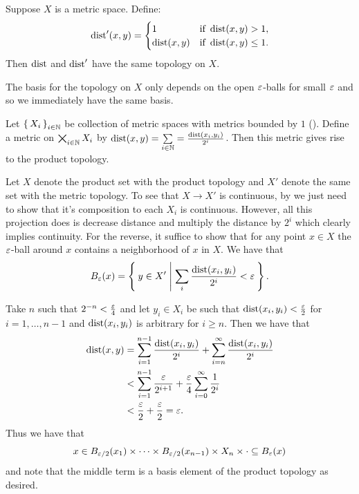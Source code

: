 \documentclass[letterpaper, 11pt, oneside]{book}
\begin{document}
\begin{prop}\label{prop: bounded_metric_leq_1}
  Suppose $X$ is a metric space. Define:
  \[
  \operatorname{dist}'(x, y) = \begin{cases}
                   1           & \text{if } \operatorname{dist}(x, y) > 1, \\
                   \operatorname{dist}(x, y) & \text{if } \operatorname{dist}(x, y) \leq 1.
                 \end{cases}
  \]
  Then $\operatorname{dist}$ and $\operatorname{dist}'$ have the same topology on $X$.
\end{prop}
\begin{pf}
  The basis for the topology on $X$ only depends on the open $\varepsilon$-balls for small $\varepsilon$ and so we immediately have the same basis.
\end{pf}

\begin{prop}\label{prop: bounded_metrics_prod_top}
  Let $\set{X_{i}}_{i \in \mathbb{N}}$ be collection of metric spaces with metrics bounded by $1$ ().
  Define a metric on $\bigtimes_{i \in \mathbb{N}} X_{i}$ by $\operatorname{dist}(x, y) = \sum\limits_{i \in \mathbb{N}} = \frac{\operatorname{dist}(x_{i}, y_{i})}{2^{i}}$.
  Then this metric gives rise to the product topology.
\end{prop}
\begin{pf}
  Let $X$ denote the product set with the product topology and $X'$ denote the same set with the metric topology.
  To see that $X \to X'$ is continuous, by  we just need to show that it's composition to each $X_{i}$ is continuous.
  However, all this projection does is decrease distance and multiply the distance by $2^{i}$ which clearly implies continuity.
  For the reverse, it suffice to show that for any point $x \in X$ the $\varepsilon$-ball around $x$ contains a neighborhood of $x$ in $X$.
  We have that
  \[
    B_{\varepsilon}(x) = \Set{y \in X' | \sum_{i} \frac{\operatorname{dist}(x_{i}, y_{i})}{2^{i}} < \varepsilon}.
  \]

  \clearpage

  Take $n$ such that $2^{-n} < \frac{\varepsilon}{4}$ and let $y_{i} \in X_{i}$ be such that $\operatorname{dist}(x_{i}, y_{i}) < \frac{\varepsilon}{2}$ for $i = 1, \ldots, n - 1$ and $\operatorname{dist}(x_{i}, y_{i})$ is arbitrary for $i \geq n$.
  Then we have that
  \begin{align*}
    \operatorname{dist}(x, y) &= \sum_{i = 1}^{n - 1} \frac{\operatorname{dist}(x_{i}, y_{i})}{2^{i}} + \sum_{i = n}^{\infty} \frac{\operatorname{dist}(x_{i}, y_{i})}{2^{i}} \\
                &< \sum_{i = 1}^{n - 1} \frac{\varepsilon}{2^{i + 1}} + \frac{\varepsilon}{4} \sum_{i = 0}^{\infty} \frac{1}{2^{i}} \\
                &< \frac{\varepsilon}{2} + \frac{\varepsilon}{2} = \varepsilon.
  \end{align*}
  Thus we have that
  \[
    x \in B_{\varepsilon/2}(x_{1}) \times \cdots \times B_{\varepsilon/2}(x_{n - 1}) \times X_{n} \times \cdot \subseteq B_{\varepsilon}(x)
  \]
  and note that the middle term is a basis element of the product topology as desired.
\end{pf}
\end{document}
